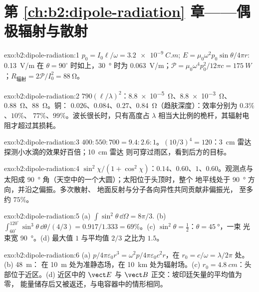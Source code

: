 \section*{第 \ref{ch:b2:dipole-radiation} 章——偶极辐射与散射}

\begin{solution}{exo:b2:dipole-radiation:1}
$p_0 = I_0\ell/\omega = \qty{3.2e-9}{C.m}$; $E = \mu_0\omega^2p_0\sin\theta/4\pi r$: \qty{0.13}{V/m}
在 $\theta = 90^\circ$ 时如上，\qty{30}{\degree} 时为 \qty{0.063}{V/m}；$\mathcal P = \mu_0\omega^4p_0^2/12\pi c =
\qty{175}{W}$；$R_{\text{辐射}} = 2\mathcal P/I_0^2 = \qty{88}{\ohm}$。
\end{solution}

\begin{solution}{exo:b2:dipole-radiation:2}
$790(\ell/\lambda)^2$：\qty{8.8e-5}{\ohm}、\qty{8.8e-3}{\ohm}、\qty{0.88}{\ohm}、\qty{88}{\ohm}。铜：
$0.026$、$0.084$、$0.27$、\qty{0.84}{\ohm}（趋肤深度）：效率分别为 $0.3\%$、$10\%$、
$77\%$、$99\%$。波长很长时，只有高度占
$\lambda$ 相当大比例的桅杆，其辐射电阻才超过其损耗。
\end{solution}

\begin{solution}{exo:b2:dipole-radiation:3}
$400 : 550 : 700 = 9.4 : 2.6 : 1$。$(10/3)^4 = 120$：\qty{3}{cm} 雷达
探测小水滴的效果好百倍；\qty{10}{cm} 雷达
则可穿过雨区，看到后方的目标。
\end{solution}

\begin{solution}{exo:b2:dipole-radiation:4}
$\sin^2\chi/(1 + \cos^2\chi)$：$0.14$、$0.60$、$1$、$0.60$。观测点与太阳成
\qty{90}{\degree} 角（天空中的一个大圆）；太阳位于头顶时，整个
地平线处于 \qty{90}{\degree} 方向，并沿之偏振。多次散射、
地面反射与分子各向异性共同贡献非偏振光，
至多约 $75\%$。
\end{solution}

\begin{solution}{exo:b2:dipole-radiation:5}
(a) $\int\sin^2\theta\,\dd\Omega = 8\pi/3$. (b) $\int_{60^\circ}^{120^\circ}\sin^3\theta\,\dd\theta/
(4/3) = 0.917/1.333 = 69\%$。(c) $\sin^2\theta = \tfrac12$：$\theta = \qty{45}{\degree}$，一束
光束宽 \qty{90}{\degree}。(d) 最大值 $1$ 与平均值 $2/3$ 之比为 $1.5$。
\end{solution}

\begin{solution}{exo:b2:dipole-radiation:6}
(a) $p/4\pi\varepsilon_0r^3 = \omega^2p/4\pi\varepsilon_0c^2r$，在 $r_0 = c/\omega = \lambda/2\pi$ 处。(b) \qty{48}{m}：
在 \qty{10}{m} 处为准静态场，在 \qty{10}{km} 处为辐射场。(c)
$r_0 = \qty{4.8}{cm}$：头部位于近区。(d) 近区中的 $\vect E$
与 $\vect B$ 正交：坡印廷矢量的平均值为零，
能量储存后又被返还，与电容器中的情形相同。
\end{solution}

